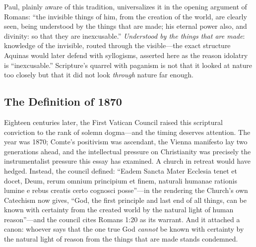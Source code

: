 Paul, plainly aware of this tradition, universalizes it in the opening argument of Romans: ``the invisible things of him, from the creation of the world, are clearly seen, being understood by the things that are made; his eternal power also, and divinity: so that they are inexcusable.'' \emph{Understood by the things that are made}: knowledge of the invisible, routed through the visible---the exact structure Aquinas would later defend with syllogisms, asserted here as the reason idolatry is ``inexcusable.'' Scripture's quarrel with paganism is not that it looked at nature too closely but that it did not look \emph{through} nature far enough.

\subsection{The Definition of 1870}

Eighteen centuries later, the First Vatican Council raised this scriptural conviction to the rank of solemn dogma---and the timing deserves attention. The year was 1870; Comte's positivism was ascendant, the Vienna manifesto lay two generations ahead, and the intellectual pressure on Christianity was precisely the instrumentalist pressure this essay has examined. A church in retreat would have hedged. Instead, the council defined: ``Eadem Sancta Mater Ecclesia tenet et docet, Deum, rerum omnium principium et finem, naturali humanae rationis lumine e rebus creatis certo cognosci posse''---in the rendering the Church's own Catechism now gives, ``God, the first principle and last end of all things, can be known with certainty from the created world by the natural light of human reason''---and the council cites Romans 1:20 as its warrant. And it attached a canon: whoever says that the one true God \emph{cannot} be known with certainty by the natural light of reason from the things that are made stands condemned.


